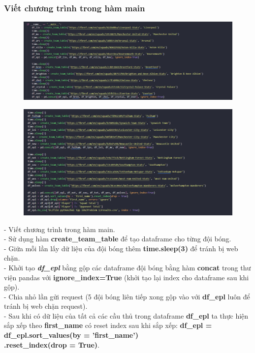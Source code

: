 \subsubsection{Viết chương trình trong hàm main}
    \begin{figure}[H]
        \centering
        \includegraphics[width=1\linewidth]{img/collect_10_team_first.png}
    \end{figure}
    \begin{figure}[H]
        \centering
        \includegraphics[width=1\linewidth]{img/collect_10_second.png}
    \end{figure}
    - Viết chương trình trong hàm main.\\
    - Sử dụng hàm \textbf{create\_team\_table} để tạo dataframe cho từng đội bóng.\\
    - Giữa mỗi lần lấy dữ liệu của đội bóng thêm \textbf{time.sleep(3)} để tránh bị web chặn.\\
    - Khởi tạo \textbf{\textit{df\_epl}} bằng gộp các dataframe đội bóng bằng hàm \textbf{concat} trong thư viện pandas với \textbf{ignore\_index=True} (khởi tạo lại index cho dataframe sau khi gộp).\\
    - Chia nhỏ lần gửi request (5 đội bóng liên tiếp xong gộp vào với \textbf{df\_epl} luôn để tránh bị web chặn request).\\
    - Sau khi có dữ liệu của tất cả các cầu thủ trong dataframe \textbf{df\_epl} ta thực hiện sắp xếp theo \textbf{first\_name} có reset index sau khi sắp xếp: \textbf{df\_epl = df\_epl.sort\_values(by = 'first\_name')\\.reset\_index(drop = True)}.\\
